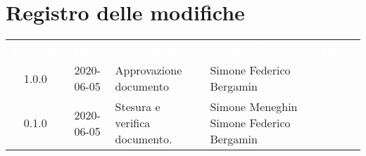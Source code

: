 \section*{Registro delle modifiche}
{
	\centering
	\begin{longtable}{ c c C{4cm}  C{4cm}  C{3cm} }
		\textcolor{white}{\textbf{Versione}} & \textcolor{white}{\textbf{Data}} & \textcolor{white}{\textbf{Descrizione}} & \textcolor{white}{\textbf{Nominativo}} & \textcolor{white}{\textbf{Ruolo}}\\		
		1.0.0 & 2020-06-05 & Approvazione documento & Simone Federico Bergamin &\RdP{}\\		
		0.1.0 & 2020-06-05 & Stesura e verifica documento. & Simone Meneghin \newline Simone Federico Bergamin &\reda{} \newline \ver{} \\		
		
	\end{longtable}

}